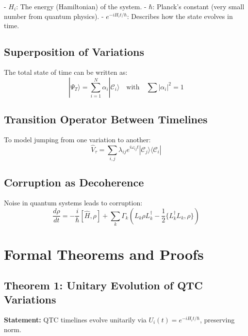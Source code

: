 \documentclass{article}
\theoremstyle{plain}
\theoremstyle{claimstyle}
\begin{document}
- \( H_i \): The energy (Hamiltonian) of the system.  
- \( \hbar \): Planck’s constant (very small number from quantum physics).  
- \( e^{-iH_it/\hbar} \): Describes how the state evolves in time.

\subsection{Superposition of Variations}

The total state of time can be written as:
\begin{equation}
|\Psi_T\rangle = \sum_{i=1}^N \alpha_i |\mathcal{C}_i\rangle
\quad \text{with} \quad \sum |\alpha_i|^2 = 1
\end{equation}


\subsection{Transition Operator Between Timelines}

To model jumping from one variation to another:
\begin{equation}
\hat{V}_\tau = \sum_{i,j} \lambda_{ij} e^{i\omega_{ij}t} |\mathcal{C}_j\rangle \langle\mathcal{C}_i|
\end{equation}


\subsection{Corruption as Decoherence}

Noise in quantum systems leads to corruption:
\begin{equation}
\frac{d\rho}{dt} = -\frac{i}{\hbar}[\hat{H},\rho] + \sum_k \Gamma_k \left(L_k \rho L_k^\dagger - \frac{1}{2}\{L_k^\dagger L_k, \rho\}\right)
\end{equation}


\section{Formal Theorems and Proofs}

\subsection*{Theorem 1: Unitary Evolution of QTC Variations}
\textbf{Statement:} QTC timelines evolve unitarily via \( U_i(t) = e^{-iH_it/\hbar} \), preserving norm.
\end{document}

